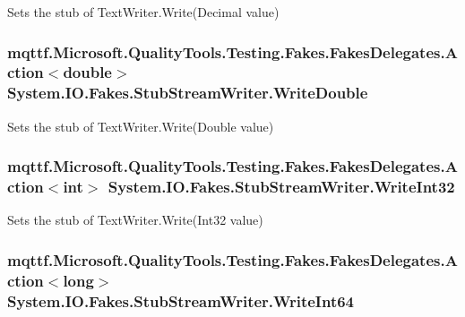 Sets the stub of Text\-Writer.\-Write(\-Decimal value)

\hypertarget{class_system_1_1_i_o_1_1_fakes_1_1_stub_stream_writer_a54d3b2567a7ce1992d64830c69ea57ce}{
\subsubsection[{Write\-Double}]{\setlength{\rightskip}{0pt plus 5cm}mqttf.\-Microsoft.\-Quality\-Tools.\-Testing.\-Fakes.\-Fakes\-Delegates.\-Action$<$double$>$ System.\-I\-O.\-Fakes.\-Stub\-Stream\-Writer.\-Write\-Double}}\label{class_system_1_1_i_o_1_1_fakes_1_1_stub_stream_writer_a54d3b2567a7ce1992d64830c69ea57ce}


Sets the stub of Text\-Writer.\-Write(\-Double value)

\hypertarget{class_system_1_1_i_o_1_1_fakes_1_1_stub_stream_writer_a50ec12a04737d3349253ddefab32344b}{
\subsubsection[{Write\-Int32}]{\setlength{\rightskip}{0pt plus 5cm}mqttf.\-Microsoft.\-Quality\-Tools.\-Testing.\-Fakes.\-Fakes\-Delegates.\-Action$<$int$>$ System.\-I\-O.\-Fakes.\-Stub\-Stream\-Writer.\-Write\-Int32}}\label{class_system_1_1_i_o_1_1_fakes_1_1_stub_stream_writer_a50ec12a04737d3349253ddefab32344b}


Sets the stub of Text\-Writer.\-Write(\-Int32 value)

\hypertarget{class_system_1_1_i_o_1_1_fakes_1_1_stub_stream_writer_a8dffd8bcd8863c3479beaf3b11e19ad0}{
\subsubsection[{Write\-Int64}]{\setlength{\rightskip}{0pt plus 5cm}mqttf.\-Microsoft.\-Quality\-Tools.\-Testing.\-Fakes.\-Fakes\-Delegates.\-Action$<$long$>$ System.\-I\-O.\-Fakes.\-Stub\-Stream\-Writer.\-Write\-Int64}}\label{class_system_1_1_i_o_1_1_fakes_1_1_stub_stream_writer_a8dffd8bcd8863c3479beaf3b11e19ad0}


